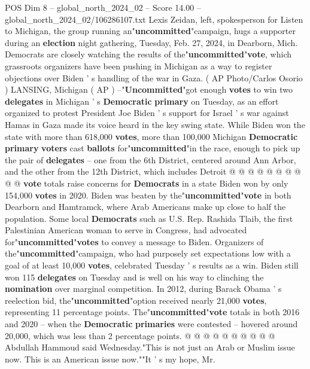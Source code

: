 \begin{textsample}{POS Dim 8 – global\_north\_2024\_02 – Score 14.00 – global\_north\_2024\_02/106286107.txt}  \label{ex:f8_pos_028}
Lexis Zeidan, left, spokesperson for Listen to Michigan, the group running an"\textbf{uncommitted}"campaign, hugs a supporter during an \textbf{election} night gathering, Tuesday, Feb. 27, 2024, in Dearborn, Mich.
Democrats are closely watching the results of the"\textbf{uncommitted}"\textbf{vote}, which grassroots organizers have been pushing in Michigan as a way to register objections over Biden ' s handling of the war in Gaza. ( AP Photo/Carlos Osorio ) LANSING, Michigan ( AP ) --"\textbf{Uncommitted}"got enough \textbf{votes} to win two \textbf{delegates} in Michigan ' s \textbf{Democratic} \textbf{primary} on Tuesday, as an effort organized to protest President Joe Biden ' s support for Israel ' s war against Hamas in Gaza made its voice heard in the key swing state.
While Biden won the state with more than 618,000 \textbf{votes}, more than 100,000 Michigan \textbf{Democratic} \textbf{primary} \textbf{voters} cast \textbf{ballots} for"\textbf{uncommitted}"in the race, enough to pick up the pair of \textbf{delegates} -- one from the 6th District, centered around Ann Arbor, and the other from the 12th District, which includes Detroit @ @ @ @ @ @ @ @ @ @ \textbf{vote} totals raise concerns for \textbf{Democrats} in a state Biden won by only 154,000 \textbf{votes} in 2020.
Biden was beaten by the"\textbf{uncommitted}"\textbf{vote} in both Dearborn and Hamtramck, where Arab Americans make up close to half the population.
Some local \textbf{Democrats} such as U.S.
Rep.
Rashida Tlaib, the first Palestinian American woman to serve in Congress, had advocated for"\textbf{uncommitted}"\textbf{votes} to convey a message to Biden.
Organizers of the"\textbf{uncommitted}"campaign, who had purposely set expectations low with a goal of at least 10,000 \textbf{votes}, celebrated Tuesday ' s results as a win.
Biden still won 115 \textbf{delegates} on Tuesday and is well on his way to clinching the \textbf{nomination} over marginal competition.
In 2012, during Barack Obama ' s reelection bid, the"\textbf{uncommitted}"option received nearly 21,000 \textbf{votes}, representing 11 percentage points.
The"\textbf{uncommitted}"\textbf{vote} totals in both 2016 and 2020 -- when the \textbf{Democratic} \textbf{primaries} were contested -- hovered around 20,000, which was less than 2 percentage points. @ @ @ @ @ @ @ @ @ @ Abdullah Hammoud said Wednesday."This is not just an Arab or Muslim issue now.
This is an American issue now.""It ' s my hope, Mr.

\end{textsample}
